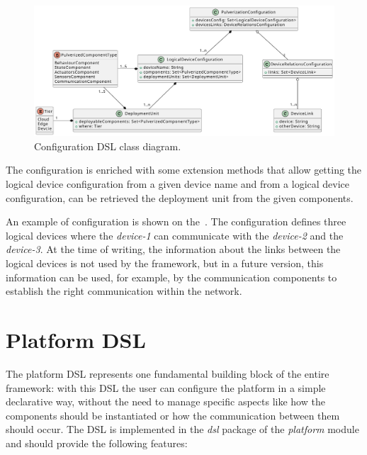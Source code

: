 \begin{figure}[ht]
	\centering
	\includegraphics[width=\textwidth]{figures/config-dsl-class.pdf}
	\caption{Configuration DSL class diagram.}
	\label{fig:configuration-dsl-classes}
\end{figure}

The configuration is enriched with some extension methods that allow getting the logical device configuration from a given device name and
from a logical device configuration, can be retrieved the deployment unit from the given components.

An example of configuration is shown on the~. The configuration defines three logical devices where the
\emph{device-1} can communicate with the \emph{device-2} and the \emph{device-3}. At the time of writing, the information about the links
between the logical devices is not used by the framework, but in a future version, this information can be used, for example, by the communication
components to establish the right communication within the network.




\section{Platform DSL}
\label{sec:platform-dsl-impl}

The platform DSL represents one fundamental building block of the entire framework: with this DSL the user can configure the platform in a simple
declarative way, without the need to manage specific aspects like how the components should be instantiated or how the communication between them
should occur. The DSL is implemented in the \emph{dsl} package of the \emph{platform} module and should provide the following features:

